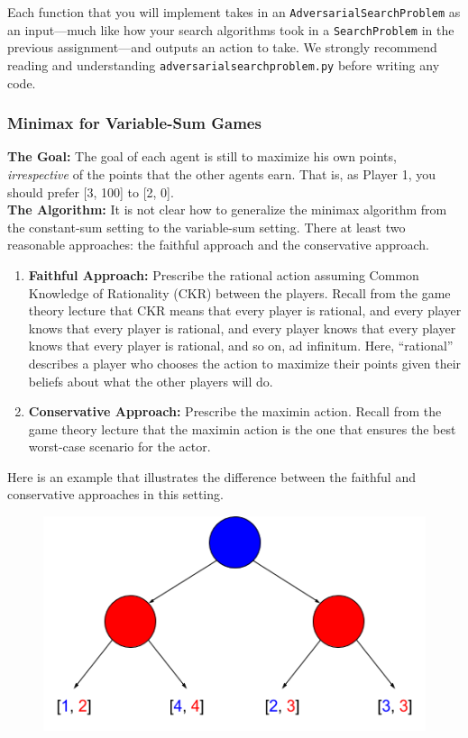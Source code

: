 \documentclass{article}
\begin{document}
Each function that you will implement takes in an \verb|AdversarialSearchProblem| as an input---much like how your search algorithms took in a \verb|SearchProblem| in the previous assignment---and outputs an action to take. 
We strongly recommend reading and understanding \verb|adversarialsearchproblem.py| before writing any code.



\subsubsection{Minimax for Variable-Sum Games}
\textbf{The Goal: } The goal of each agent is still to maximize his own points, \textit{irrespective} of the points that the other agents earn.
That is, as Player 1, you should prefer [3, 100] to [2, 0]. ~\\

\textbf{The Algorithm: }It is not clear how to generalize the minimax algorithm from the constant-sum setting to the variable-sum setting.
There at least two reasonable approaches: the faithful approach and the conservative approach.
\begin{enumerate}
    \item \textbf{Faithful Approach:} Prescribe the rational action assuming Common Knowledge of Rationality (CKR) between the players.
     Recall from the game theory lecture that
     CKR means that every player is rational, and every player knows that every player is rational, and every player knows that every player knows that every player is rational, and so on, ad infinitum.
     Here, ``rational'' describes a player who chooses the action to maximize their points given their beliefs about what the other players will do.
    
     \item \textbf{Conservative Approach:} Prescribe the maximin action.
    Recall from the game theory lecture that the maximin action is the one that ensures the best worst-case scenario for the actor.
\end{enumerate}

Here is an example that illustrates the difference between the faithful and conservative approaches in this setting.
\begin{figure}[h]
\includegraphics[scale = 0.4]{variable-sum-minimax-example.png}
\centering
\end{figure}
\end{document}

